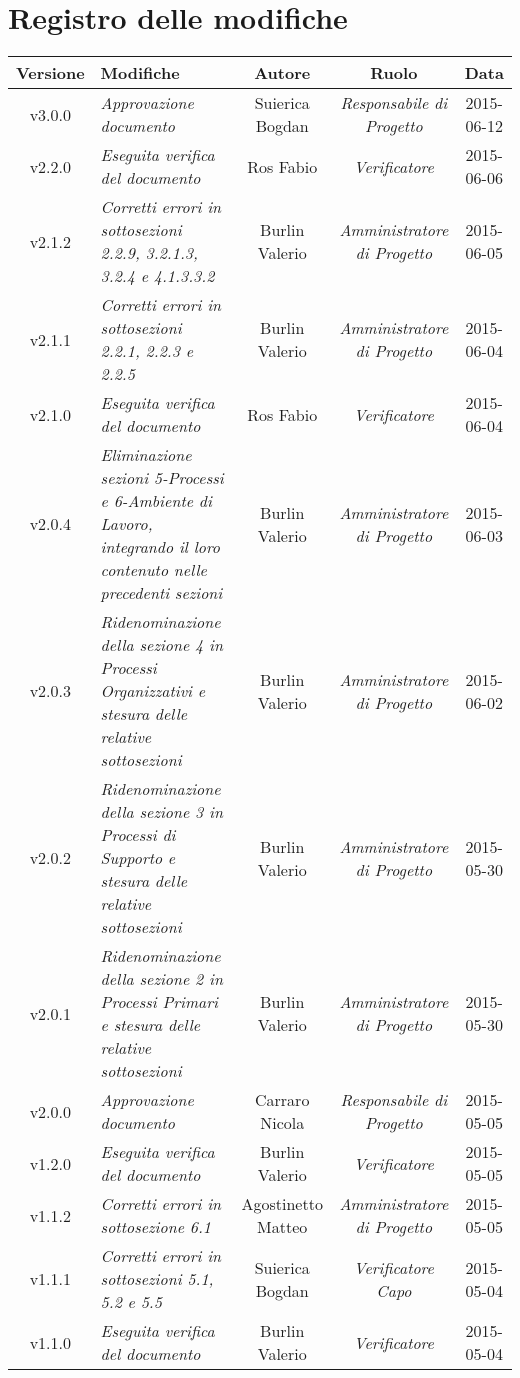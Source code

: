 \newpage
\section*{Registro delle modifiche}

\begin{table}[h]
\centering
\begin{tabular}{|c|p{}|c|c|c|}
	\toprule
		\textbf{Versione} & \textbf{Modifiche} & \textbf{Autore} & \textbf{Ruolo} & \textbf{Data} \\
	\midrule
	\midrule
		v3.0.0 & \textit{Approvazione documento} & Suierica Bogdan & \textit{Responsabile di Progetto} & 2015-06-12\\
	\midrule
		v2.2.0 & \textit{Eseguita verifica del documento} & Ros Fabio & \textit{Verificatore} & 2015-06-06\\
	\midrule
		v2.1.2 & \textit{Corretti errori in sottosezioni 2.2.9, 3.2.1.3, 3.2.4 e 4.1.3.3.2} & Burlin Valerio & \textit{Amministratore di Progetto} & 2015-06-05\\
	\midrule
		v2.1.1 & \textit{Corretti errori in sottosezioni 2.2.1, 2.2.3 e 2.2.5} & Burlin Valerio & \textit{Amministratore di Progetto} & 2015-06-04\\
	\midrule
		v2.1.0 & \textit{Eseguita verifica del documento} & Ros Fabio & \textit{Verificatore} & 2015-06-04\\
	\midrule
		v2.0.4 & \textit{Eliminazione sezioni 5-Processi e 6-Ambiente di Lavoro, integrando il loro contenuto nelle precedenti sezioni} & Burlin Valerio & \textit{Amministratore di Progetto} & 2015-06-03\\
	\midrule
		v2.0.3 & \textit{Ridenominazione della sezione 4 in Processi Organizzativi e stesura delle relative sottosezioni} & Burlin Valerio & \textit{Amministratore di Progetto} & 2015-06-02\\
	\midrule
		v2.0.2 & \textit{Ridenominazione della sezione 3 in Processi di Supporto e stesura delle relative sottosezioni} & Burlin Valerio & \textit{Amministratore di Progetto} & 2015-05-30\\
	\midrule
		v2.0.1 & \textit{Ridenominazione della sezione 2 in Processi Primari e stesura delle relative sottosezioni} & Burlin Valerio & \textit{Amministratore di Progetto} & 2015-05-30\\
	\midrule
		v2.0.0 & \textit{Approvazione documento} & Carraro Nicola & \textit{Responsabile di Progetto} & 2015-05-05\\
	\midrule
		v1.2.0 & \textit{Eseguita verifica del documento} & Burlin Valerio & \textit{Verificatore} & 2015-05-05\\
	\midrule
		v1.1.2 & \textit{Corretti errori in sottosezione 6.1} & Agostinetto Matteo & \textit{Amministratore di Progetto} & 2015-05-05\\
	\midrule
		v1.1.1 & \textit{Corretti errori in sottosezioni 5.1, 5.2 e 5.5} & Suierica Bogdan & \textit{Verificatore Capo} & 2015-05-04\\
	\midrule
		v1.1.0 & \textit{Eseguita verifica del documento} & Burlin Valerio & \textit{Verificatore} & 2015-05-04\\
	\bottomrule
\end{tabular}
\end{table}
